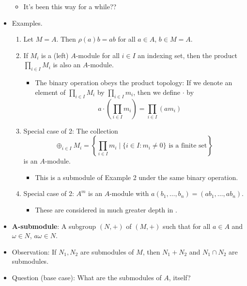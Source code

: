 \documentclass[../notes.tex]{subfiles}
\begin{document}
\begin{itemize}
    \begin{itemize}
        \item It's been this way for a while??
    \end{itemize}
    \item Examples.
    \begin{enumerate}
        \item Let $M=A$. Then $\rho(a)b=ab$ for all $a\in A$, $b\in M=A$.
        \item If $M_i$ is a (left) $A$-module for all $i\in I$ an indexing set, then the product $\prod_{i\in I}M_i$ is also an $A$-module.
        \begin{itemize}
            \item The binary operation obeys the product topology: If we denote an element of $\prod_{i\in I}M_i$ by $\prod_{i\in I}m_i$, then we define $\cdot$ by
            \begin{equation*}
                a\cdot\left( \prod_{i\in I}m_i \right) = \prod_{i\in I}(am_i)
            \end{equation*}
        \end{itemize}
        \item Special case of 2: The collection
        \begin{equation*}
            \oplus_{i\in I}M_i = \left\{ \prod_{i\in I}m_i\mid\{i\in I:m_i\neq 0\}\text{ is a finite set} \right\}
        \end{equation*}
        is an $A$-module.
        \begin{itemize}
            \item This is a submodule of Example 2 under the same binary operation.
        \end{itemize}
        \item Special case of 2: $A^m$ is an $A$-module with $a(b_1,\dots,b_n)=(ab_1,\dots,ab_n)$.
        \begin{itemize}
            \item These are considered in much greater depth in \textcite{bib:DummitFoote}.
        \end{itemize}
    \end{enumerate}
    \item \textbf{$\bm{A}$-submodule}: A subgroup $(N,+)$ of $(M,+)$ such that for all $a\in A$ and $\omega\in N$, $a\omega\in N$.
    \item Observation: If $N_1,N_2$ are submodules of $M$, then $N_1+N_2$ and $N_1\cap N_2$ are submodules.
    \item Question (base case): What are the submodules of $A$, itself?

\end{itemize}
\end{document}
